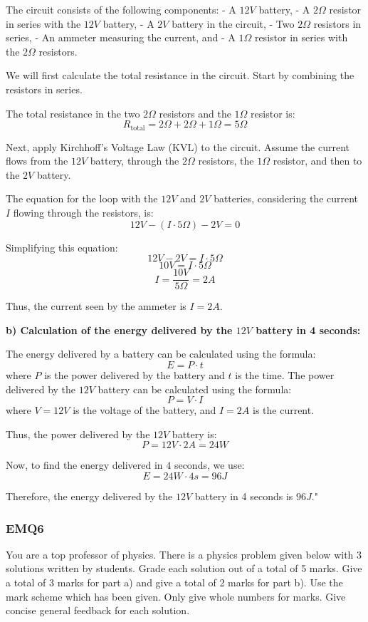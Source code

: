 The circuit consists of the following components:
- A $12V$ battery,
- A $2\Omega$ resistor in series with the $12V$ battery,
- A $2V$ battery in the circuit,
- Two $2\Omega$ resistors in series,
- An ammeter measuring the current, and
- A $1\Omega$ resistor in series with the $2\Omega$ resistors.

We will first calculate the total resistance in the circuit. Start by combining the resistors in series.

The total resistance in the two $2\Omega$ resistors and the $1\Omega$ resistor is:
\[
R_{\text{total}} = 2\Omega + 2\Omega + 1\Omega = 5\Omega
\]

Next, apply Kirchhoff’s Voltage Law (KVL) to the circuit. Assume the current flows from the $12V$ battery, through the $2\Omega$ resistors, the $1\Omega$ resistor, and then to the $2V$ battery. 

The equation for the loop with the $12V$ and $2V$ batteries, considering the current $I$ flowing through the resistors, is:
\[
12V - (I \cdot 5\Omega) - 2V = 0
\]

Simplifying this equation:
\[
12V - 2V = I \cdot 5\Omega
\]
\[
10V = I \cdot 5\Omega
\]
\[
I = \frac{10V}{5\Omega} = 2A
\]

Thus, the current seen by the ammeter is $I = 2A$.

\textbf{b) Calculation of the energy delivered by the $12V$ battery in 4 seconds:}

The energy delivered by a battery can be calculated using the formula:
\[
E = P \cdot t
\]
where $P$ is the power delivered by the battery and $t$ is the time. The power delivered by the $12V$ battery can be calculated using the formula:
\[
P = V \cdot I
\]
where $V = 12V$ is the voltage of the battery, and $I = 2A$ is the current.

Thus, the power delivered by the $12V$ battery is:
\[
P = 12V \cdot 2A = 24W
\]

Now, to find the energy delivered in $4$ seconds, we use:
\[
E = 24W \cdot 4s = 96J
\]

Therefore, the energy delivered by the $12V$ battery in 4 seconds is $96J$."


\subsubsection{EMQ6}

You are a top professor of physics. There is a physics problem given below with 3 solutions written by students. Grade each solution out of a total of 5 marks. Give a total of 3 marks for part a) and give a total of 2 marks for part b). Use the mark scheme which has been given. Only give whole numbers for marks. Give concise general feedback for each solution. 

